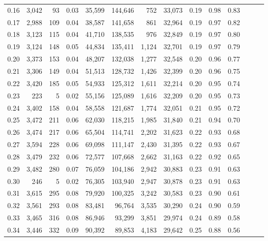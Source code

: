 \begin{tabular}{rrrrrrrrrrrrrr}
0.16 &  3,042 &     93 &  0.03 &   35,599 &  144,646 &     752 &  33,073 &  0.19 &  0.98 &      0.83 \\
0.17 &  2,988 &    109 &  0.04 &   38,587 &  141,658 &     861 &  32,964 &  0.19 &  0.97 &      0.82 \\
0.18 &  3,123 &    115 &  0.04 &   41,710 &  138,535 &     976 &  32,849 &  0.19 &  0.97 &      0.80 \\
0.19 &  3,124 &    148 &  0.05 &   44,834 &  135,411 &   1,124 &  32,701 &  0.19 &  0.97 &      0.79 \\
0.20 &  3,373 &    153 &  0.04 &   48,207 &  132,038 &   1,277 &  32,548 &  0.20 &  0.96 &      0.77 \\
0.21 &  3,306 &    149 &  0.04 &   51,513 &  128,732 &   1,426 &  32,399 &  0.20 &  0.96 &      0.75 \\
0.22 &  3,420 &    185 &  0.05 &   54,933 &  125,312 &   1,611 &  32,214 &  0.20 &  0.95 &      0.74 \\
0.23 &    223 &      5 &  0.02 &   55,156 &  125,089 &   1,616 &  32,209 &  0.20 &  0.95 &      0.73 \\
0.24 &  3,402 &    158 &  0.04 &   58,558 &  121,687 &   1,774 &  32,051 &  0.21 &  0.95 &      0.72 \\
0.25 &  3,472 &    211 &  0.06 &   62,030 &  118,215 &   1,985 &  31,840 &  0.21 &  0.94 &      0.70 \\
0.26 &  3,474 &    217 &  0.06 &   65,504 &  114,741 &   2,202 &  31,623 &  0.22 &  0.93 &      0.68 \\
0.27 &  3,594 &    228 &  0.06 &   69,098 &  111,147 &   2,430 &  31,395 &  0.22 &  0.93 &      0.67 \\
0.28 &  3,479 &    232 &  0.06 &   72,577 &  107,668 &   2,662 &  31,163 &  0.22 &  0.92 &      0.65 \\
0.29 &  3,482 &    280 &  0.07 &   76,059 &  104,186 &   2,942 &  30,883 &  0.23 &  0.91 &      0.63 \\
0.30 &    246 &      5 &  0.02 &   76,305 &  103,940 &   2,947 &  30,878 &  0.23 &  0.91 &      0.63 \\
0.31 &  3,615 &    295 &  0.08 &   79,920 &  100,325 &   3,242 &  30,583 &  0.23 &  0.90 &      0.61 \\
0.32 &  3,561 &    293 &  0.08 &   83,481 &   96,764 &   3,535 &  30,290 &  0.24 &  0.90 &      0.59 \\
0.33 &  3,465 &    316 &  0.08 &   86,946 &   93,299 &   3,851 &  29,974 &  0.24 &  0.89 &      0.58 \\
0.34 &  3,446 &    332 &  0.09 &   90,392 &   89,853 &   4,183 &  29,642 &  0.25 &  0.88 &      0.56 \\

\end{tabular}
